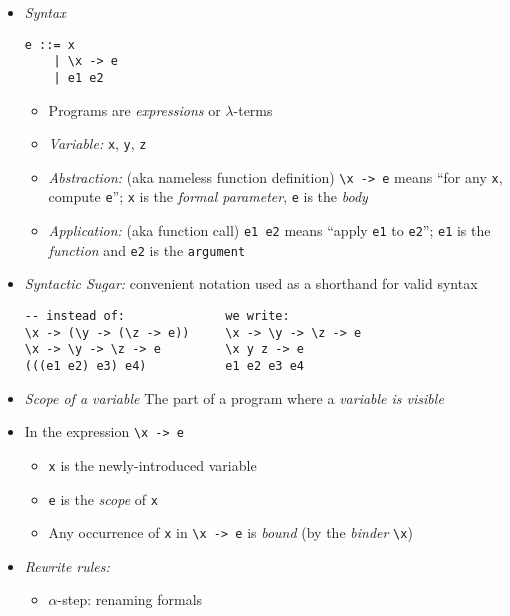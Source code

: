 \documentclass[landscape,8pt]{extarticle}
\newcommand{\code}{\lstinline}
\begin{document}
\footnotesize
\begin{multicols}{4}
    \setlength{\premulticols}{1pt}
    \setlength{\postmulticols}{1pt}
    \setlength{\multicolsep}{1pt}
    \setlength{\columnsep}{2pt}
    \begin{itemize}
        \item \emph{Syntax}
        \begin{lstlisting}
e ::= x
    | \x -> e
    | e1 e2
        \end{lstlisting}
        \begin{itemize}
            \item Programs are \emph{expressions} or $\lambda$-terms
            \item \emph{Variable:} \code{x}, \code{y}, \code{z}
            \item \emph{Abstraction:} (aka nameless function definition) \code{\x -> e} means ``for any \code{x}, compute \code{e}''; \code{x} is the \emph{formal parameter}, \code{e} is the \emph{body}
            \item \emph{Application:} (aka function call) \code{e1 e2} means ``apply \code{e1} to \code{e2}''; \code{e1} is the \emph{function} and \code{e2} is the \code{argument}
        \end{itemize}
        \item \emph{Syntactic Sugar:} convenient notation used as a shorthand for valid syntax
        \begin{lstlisting}
-- instead of:              we write:
\x -> (\y -> (\z -> e))     \x -> \y -> \z -> e
\x -> \y -> \z -> e         \x y z -> e
(((e1 e2) e3) e4)           e1 e2 e3 e4
        \end{lstlisting}
        \item \emph{Scope of a variable} The part of a program where a \emph{variable is visible}
        \item In the expression \code{\x -> e}
        \begin{itemize}
            \item \code{x} is the newly-introduced variable
            \item \code{e} is the \emph{scope} of \code{x}
            \item Any occurrence of \code{x} in \code{\x -> e} is \emph{bound} (by the \emph{binder} \code{\x})
        \end{itemize}
        \item \emph{Rewrite rules:}
        \begin{itemize}
            \item $\alpha$-step: renaming formals

\end{itemize}
\end{itemize}
\end{multicols}
\end{document}
